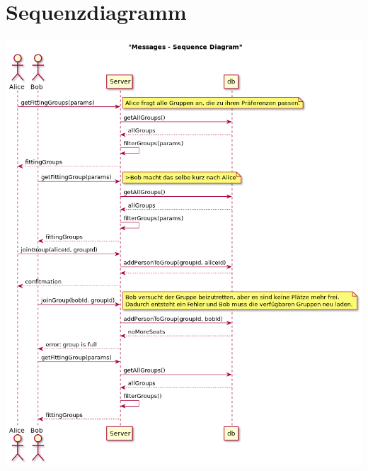 \documentclass[a4paper]{scrreprt}
\begin{document}
\section{Sequenzdiagramm}
\begin{center}
	\includegraphics[scale=0.57]{res/Szenario_Fail.png}
\end{center}
\newpage
\end{document}
